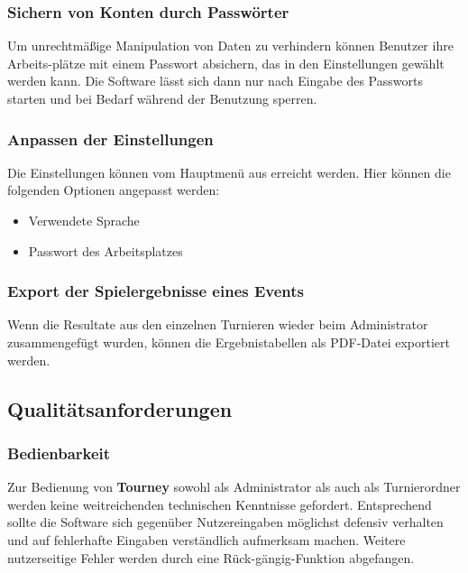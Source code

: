 \documentclass[11pt]{article}
\begin{document}
\subsubsection{Sichern von Konten durch Passwörter}

Um unrechtmäßige Manipulation von Daten zu verhindern können Benutzer ihre Arbeits-plätze mit einem Passwort absichern, das in den Einstellungen gewählt werden kann. Die Software lässt sich dann nur nach Eingabe des Passworts starten und bei Bedarf während der Benutzung sperren.

\subsubsection{Anpassen der Einstellungen}

Die Einstellungen können vom Hauptmenü aus erreicht werden. Hier können die folgenden Optionen angepasst werden:
\begin{itemize}
	\item Verwendete Sprache
	\item Passwort des Arbeitsplatzes
\end{itemize}

\subsubsection{Export der Spielergebnisse eines Events}

Wenn die Resultate aus den einzelnen Turnieren wieder beim Administrator zusammengefügt wurden, können die Ergebnistabellen als PDF-Datei exportiert werden.

\newpage

\subsection{Qualitätsanforderungen}

\subsubsection{Bedienbarkeit}

Zur Bedienung von \textbf{Tourney} sowohl als Administrator als auch als Turnierordner werden keine weitreichenden technischen Kenntnisse gefordert. Entsprechend sollte die Software sich gegenüber Nutzereingaben möglichst defensiv verhalten und auf fehlerhafte Eingaben verständlich aufmerksam machen. Weitere nutzerseitige Fehler werden durch eine Rück-gängig-Funktion abgefangen.
\end{document}
